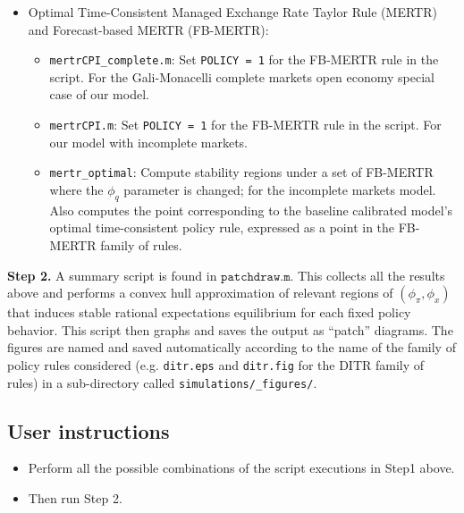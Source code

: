\documentclass[11pt]{article}
\begin{document}
\begin{itemize}
\item Optimal Time-Consistent Managed Exchange Rate Taylor Rule (MERTR) and Forecast-based MERTR (FB-MERTR):
	\begin{itemize}
	\item \texttt{mertrCPI\_complete.m}: Set \texttt{POLICY = 1} for the FB-MERTR rule in the script.  For the Gali-Monacelli complete markets open economy special case of our model.
	\item \texttt{mertrCPI.m}: Set \texttt{POLICY = 1} for the FB-MERTR rule in the script. For our model with incomplete markets.
	\item \texttt{mertr\_optimal}: Compute stability regions under a set of FB-MERTR where the $\phi_{q}$ parameter is changed; for the incomplete markets model. Also computes the point corresponding to the baseline calibrated model's optimal time-consistent policy rule, expressed as a point in the FB-MERTR family of rules.
	\end{itemize}	
\end{itemize}

\noindent\textbf{Step 2.} A summary script is found in $\texttt{patchdraw.m}$. This collects all the results above and performs a convex hull approximation of relevant regions of $(\phi_{\pi}, \phi_{x})$ that induces stable rational expectations equilibrium for each fixed policy behavior. This script then graphs and saves the output as ``patch'' diagrams. The figures are named and saved automatically according to the name of the family of policy rules considered (e.g. \texttt{ditr.eps} and \texttt{ditr.fig} for the DITR family of rules) in a sub-directory called \texttt{simulations/\_{figures}/}.

\subsection{User instructions}

\begin{itemize}
\item Perform all the possible combinations of the script executions in Step1 above.
\item Then run Step 2.
\end{itemize}
\end{document}
